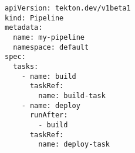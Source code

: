 \begin{verbatim}
apiVersion: tekton.dev/v1beta1
kind: Pipeline
metadata:
  name: my-pipeline
  namespace: default
spec:
  tasks:
    - name: build
      taskRef:
        name: build-task
    - name: deploy
      runAfter:
        - build
      taskRef:
        name: deploy-task
\end{verbatim}